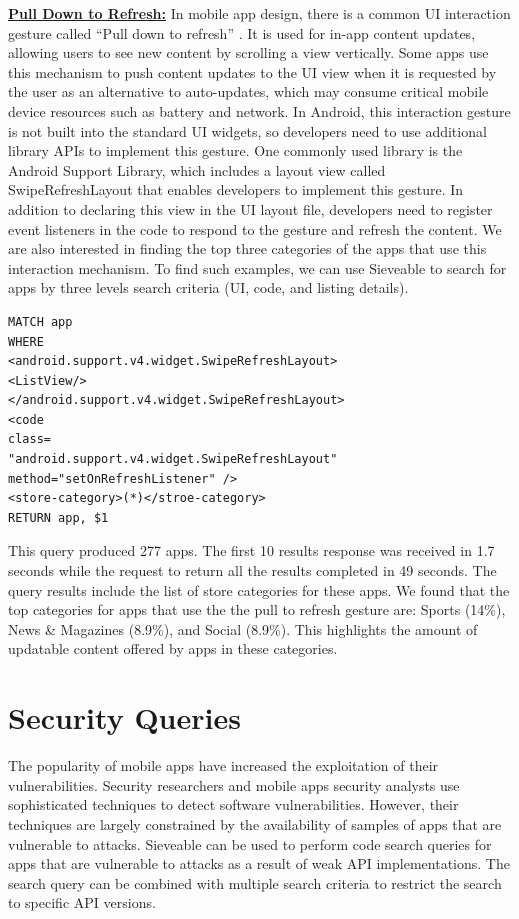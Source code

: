 \underline{\textbf{Pull Down to Refresh:}}
In mobile app design, there is a common UI interaction gesture called ``Pull down to refresh'' \cite{brichter2010user}.
It is used for in-app content updates, allowing users to see new content by scrolling a view vertically.
Some apps use this mechanism to push content updates to the UI view when it is requested by the user as an alternative to auto-updates, which may consume critical mobile device resources such as battery and network.
In Android, this interaction gesture is not built into the standard UI widgets, so developers need to use additional library APIs to implement this gesture.
One commonly used library is the  Android Support Library, which includes a layout view called SwipeRefreshLayout that enables developers to implement this gesture.
In addition to declaring this view in the UI layout file, developers need to register event listeners in the code to respond to the gesture and refresh the content.
We are also interested in finding the top three categories of the apps that use this interaction mechanism.
To find such examples, we can use Sieveable to search for apps by three levels search criteria (UI, code, and listing details).

\begin{verbatim}
MATCH app
WHERE
<android.support.v4.widget.SwipeRefreshLayout>
<ListView/>
</android.support.v4.widget.SwipeRefreshLayout>
<code 
class=
"android.support.v4.widget.SwipeRefreshLayout"
method="setOnRefreshListener" />
<store-category>(*)</stroe-category>
RETURN app, $1
\end{verbatim}

This query produced 277 apps.
The first 10 results response was received in 1.7 seconds while the request to return all the results completed in 49 seconds.
The query results include the list of store categories for these apps. We found that the top categories for apps that use the the pull to refresh gesture are: Sports (14\%), News \& Magazines (8.9\%), and Social (8.9\%).
This highlights the amount of updatable content offered by apps in these categories.

\section{Security Queries}
The popularity of mobile apps have increased the exploitation of their vulnerabilities.
Security researchers and mobile apps security analysts use sophisticated techniques to detect software vulnerabilities.
However, their techniques are largely constrained by the availability of samples of apps that are vulnerable to attacks.
Sieveable can be used to perform code search queries for apps that are vulnerable to attacks as a result of weak API implementations.
The search query can be combined with multiple search criteria to restrict the search to specific API versions.

